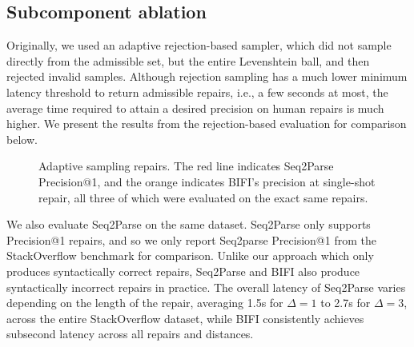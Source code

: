 \documentclass[sigplan,review,acmsmall,nonacm,anonymous]{acmart}\settopmatter{printfolios=false,printccs=false,printacmref=false}
\begin{document}

  \clearpage\subsection{Subcomponent ablation}\label{sec:rq3}

  Originally, we used an adaptive rejection-based sampler, which did not sample directly from the admissible set, but the entire Levenshtein ball, and then rejected invalid samples. Although rejection sampling has a much lower minimum latency threshold to return admissible repairs, i.e., a few seconds at most, the average time required to attain a desired precision on human repairs is much higher. We present the results from the rejection-based evaluation for comparison below.

  \begin{figure}[H]
    \resizebox{.24\textwidth}{!}{}
    \resizebox{.25\textwidth}{!}{}
    \resizebox{.24\textwidth}{!}{}
    \resizebox{.24\textwidth}{!}{}
    \caption{Adaptive sampling repairs. The red line indicates Seq2Parse Precision@1, and the orange indicates BIFI's precision at single-shot repair, all three of which were evaluated on the exact same repairs.}\label{fig:adaptive}
  \end{figure}

  We also evaluate Seq2Parse on the same dataset. Seq2Parse only supports Precision@1 repairs, and so we only report Seq2parse Precision@1 from the StackOverflow benchmark for comparison. Unlike our approach which only produces syntactically correct repairs, Seq2Parse and BIFI also produce syntactically incorrect repairs in practice. The overall latency of Seq2Parse varies depending on the length of the repair, averaging 1.5s for $\Delta=1$ to 2.7s for $\Delta=3$, across the entire StackOverflow dataset, while BIFI consistently achieves subsecond latency across all repairs and distances.
\end{document}
